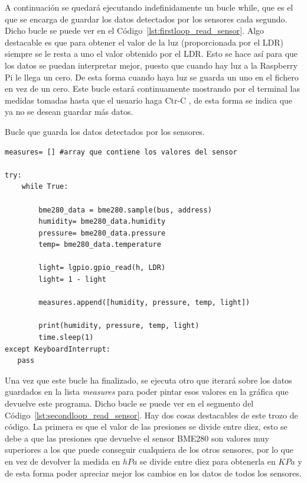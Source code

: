\documentclass[a4paper, 12pt]{book}
\begin{document}
A continuación se quedará ejecutando indefinidamente un bucle while, que es el que se encarga de guardar los datos detectados por los sensores cada segundo. Dicho bucle se puede ver en el Código~\ref{lst:firstloop_read_sensor}. Algo destacable es que para obtener el valor de la luz (proporcionada por el LDR) siempre se le resta a uno el valor obtenido por el LDR. Esto se hace así para que los datos se puedan interpretar mejor, puesto que cuando hay luz a la Raspberry Pi le llega un cero. De esta forma cuando haya luz se guarda un uno en el fichero en vez de un cero. 
Este bucle estará continuamente mostrando por el terminal las medidas tomadas hasta que el usuario haga Ctr-C , de esta forma se indica que ya no se desean guardar más datos.

\begin{listing}[]
    \caption{Bucle que guarda los datos detectados por los sensores.}{}
    \label{lst:firstloop_read_sensor}
    \begin{verbatim}
measures= [] #array que contiene los valores del sensor

try:
    while True:

        bme280_data = bme280.sample(bus, address)
        humidity= bme280_data.humidity
        pressure= bme280_data.pressure
        temp= bme280_data.temperature
        
        light= lgpio.gpio_read(h, LDR)
        light= 1 - light
        
        measures.append([humidity, pressure, temp, light])
        
        print(humidity, pressure, temp, light)
        time.sleep(1)
except KeyboardInterrupt:
   pass  
    \end{verbatim}
\end{listing}

Una vez que este bucle ha finalizado, se ejecuta otro que iterará sobre los datos guardados en la lista \textit{measures} para poder pintar esos valores en la gráfica que devuelve este programa. Dicho bucle se puede ver en el segmento del Código~\ref{lst:secondloop_read_sensor}. Hay dos cosas destacables de este trozo de código. La primera es que el valor de las presiones se divide entre diez, esto se debe a que las presiones que devuelve el sensor BME280 son valores muy superiores a los que puede conseguir cualquiera de los otros sensores, por lo que en vez de devolver la medida en $hPa$ se divide entre diez para obtenerla en $KPa$ y de esta forma poder apreciar mejor los cambios en los datos de todos los sensores.
\end{document}
